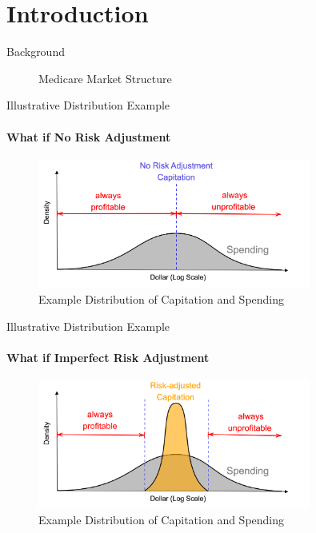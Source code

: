 \section{Introduction}

\begin{frame}{Background}
\begin{figure}
    \centering
    
    \caption{Medicare Market Structure}
\end{figure}
\end{frame}

\begin{frame}{Illustrative Distribution Example}
    \framesubtitle{What if No Risk Adjustment}
    \begin{figure}
        \includegraphics[width=0.8\textwidth]{figures/images/example_0.png}
        \caption{Example Distribution of Capitation and Spending}
    \end{figure}
\end{frame}


\begin{frame}[label=example_distribution]{Illustrative Distribution Example}
    \framesubtitle{What if Imperfect Risk Adjustment}
    \begin{figure}
        \includegraphics[width=0.8\textwidth]{figures/images/example_1.png}
        \caption{Example Distribution of Capitation and Spending}
    \end{figure}
    \hyperlink{actual_distribution}{}
    \hyperlink{example_alternative}{}
\end{frame}


